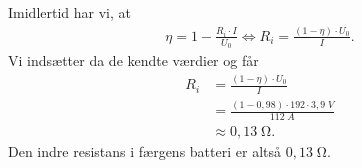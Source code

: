 \documentclass{report}
\begin{document}
Imidlertid har vi, at
\begin{equation*}
\begin{split}
  \eta =1-\frac{R_i \cdot I}{U_0} \iff R_i =\frac{(1-\eta) \cdot U_0}{I}.
\end{split}
\end{equation*}
Vi indsætter da de kendte værdier og får
\begin{equation*}
\begin{split}
  R_i &=\frac{(1-\eta) \cdot U_0}{I}\\
  &=\frac{(1-0,98)\cdot 192 \cdot 3,9 \;\unit{V} }{112 \;\unit{A} }\\
  &\approx 0,13 \;\unit{\ohm}. 
\end{split}
\end{equation*}
Den indre resistans i færgens batteri er altså $0,13 \;\unit{\ohm}$.
\end{document}
